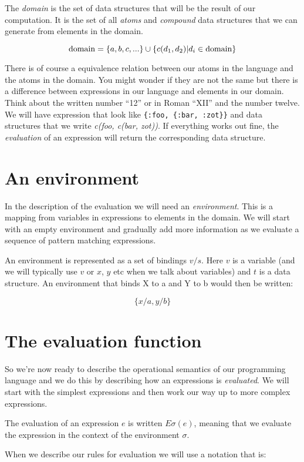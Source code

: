 \documentclass[a4paper,11pt]{article}
\begin{document}
The {\em domain} is the set of data structures that will be the result
of our computation. It is the set of all {\em atoms} and {\em
  compound} data structures that we can generate from elements in the
domain.

$${\rm domain} = \{a,b,c, ...\} \cup \{c(d_1, d_2) | d_i \in {\rm domain}\}$$

There is of course a equivalence relation between our atoms in the
language and the atoms in the domain. You might wonder if they are not
the same but there is a difference between expressions in our language
and elements in our domain. Think about the written number ``12'' or
in Roman ``XII'' and the number twelve. We will have expression that
look like {\tt \{:foo, \{:bar, :zot\}\}} and data structures that we
write {\em c(foo, c(bar, zot))}. If everything works out fine, the
{\em evaluation} of an expression will return the corresponding data
structure.

\section{An environment}

In the description of the evaluation we will need an {\em
  environment}. This is a mapping from variables in expressions to
elements in the domain. We will start with an empty environment and
gradually add more information as we evaluate a sequence of pattern
matching expressions. 

An environment is represented as a set of bindings $v/s$. Here $v$ is
a variable (and we will typically use $v$ or $x$, $y$ etc when we talk
about variables) and $t$ is a data structure. An environment that
binds X to a and Y to b would then be written:

$$\{x/a, y/b\}$$


\section{The evaluation function}

So we're now ready to describe the operational semantics of our
programming language and we do this by describing how an expressions is
{\em evaluated}. We will start with the simplest expressions and then
work our way up to more complex expressions.

The evaluation of an expression $e$ is written $E\sigma(e)$, meaning
that we evaluate the expression in the context of the environment $\sigma$.

When we describe our rules for evaluation we will use
 a notation that is:
\end{document}
